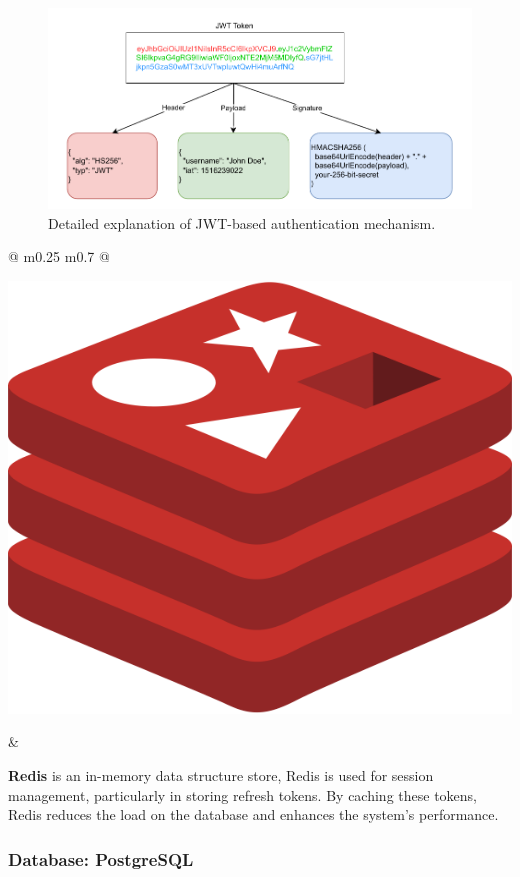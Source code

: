 	\begin{figure}[H]
		\centering
		\includegraphics[width=1.1\columnwidth]{graphics/jwt-explained.pdf}
		\caption{Detailed explanation of JWT-based authentication mechanism.}
		\label{fig:jwt-explained}
	\end{figure}
	
	
		\vspace*{0.5cm}
	\begin{tabular}{ @{} m{0.25\textwidth} m{0.7\textwidth} @{} }
		\begin{minipage}{\linewidth}
			\centering
			\includegraphics[width=0.5\linewidth]{graphics/redis.png}
			\label{fig:redis}
		\end{minipage}
		&
		\begin{minipage}{\linewidth}
			\textbf{Redis} is an in-memory data structure store, Redis is used for session management, particularly in storing refresh tokens. By caching these tokens, Redis reduces the load on the database and enhances the system’s performance.
		\end{minipage}
	\end{tabular}
	
	
	
	\subsubsection{Database: PostgreSQL}
	
